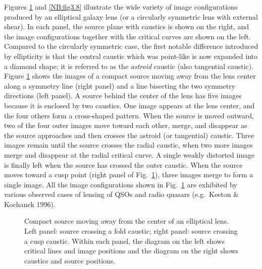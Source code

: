 \documentclass[a4paper,10pt]{article} %
\begin{document}
Figures \ref{NB:fig3.7} and \ref{NB:fig3.8} illustrate the wide
variety of image configurations produced by an elliptical galaxy lens
(or a circularly symmetric lens with external shear). In each panel,
the source plane with caustics is shown on the right, and the image
configurations together with the critical curves are shown on the
left. Compared to the circularly symmetric case, the first notable
difference introduced by ellipticity is that the central caustic which
was point-like is now expanded into a diamond shape; it is referred to
as the {\em astroid\/} caustic (also tangential caustic). Figure
\ref{NB:fig3.7} shows the images of a compact source moving away from
the lens center along a symmetry line (right panel) and a line
bisecting the two symmetry directions (left panel). A source behind
the center of the lens has five images because it is enclosed by two
caustics. One image appears at the lens center, and the four others
form a cross-shaped pattern. When the source is moved outward, two of
the four outer images move toward each other, merge, and disappear as
the source approaches and then crosses the astroid (or tangential)
caustic. Three images remain until the source crosses the radial
caustic, when two more images merge and disappear at the radial
critical curve. A single weakly distorted image is finally left when
the source has crossed the outer caustic. When the source moves toward
a cusp point (right panel of Fig.\ \ref{NB:fig3.7}), three images
merge to form a single image. All the image configurations shown in
Fig.\ \ref{NB:fig3.7} are exhibited by various observed cases of
lensing of QSOs and radio quasars (e.g.\ Keeton \& Kochanek 1996).

\begin{figure}[ht] %
\begin{center}
\begin{minipage}[t]{0.45\hsize}
\end{minipage}
\begin{minipage}[t]{0.45\hsize}
\end{minipage}
\end{center}
\caption{Compact source moving away from the center of an elliptical
  lens. Left panel: source crossing a fold caustic; right panel:
  source crossing a cusp caustic. Within each panel, the diagram on
  the left shows critical lines and image positions and the diagram on
  the right shows caustics and source positions.}
\label{NB:fig3.7}
\end{figure}
\end{document}
